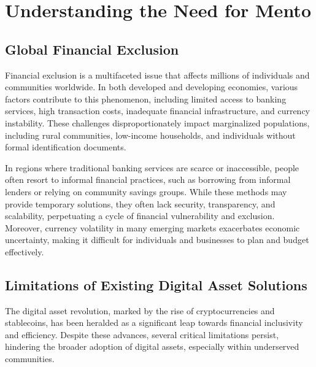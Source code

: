 \documentclass[a4paper]{article}
\theoremstyle{definition}
\begin{document}
\section{Understanding the Need for Mento}
\label{sec:need_for_mento}

\subsection{Global Financial Exclusion}

Financial exclusion is a multifaceted issue that affects millions of individuals and communities worldwide. In both developed and developing economies, various factors contribute to this phenomenon, including limited access to banking services, high transaction costs, inadequate financial infrastructure, and currency instability. These challenges disproportionately impact marginalized populations, including rural communities, low-income households, and individuals without formal identification documents.

In regions where traditional banking services are scarce or inaccessible, people often resort to informal financial practices, such as borrowing from informal lenders or relying on community savings groups. While these methods may provide temporary solutions, they often lack security, transparency, and scalability, perpetuating a cycle of financial vulnerability and exclusion. Moreover, currency volatility in many emerging markets exacerbates economic uncertainty, making it difficult for individuals and businesses to plan and budget effectively.

\subsection{Limitations of Existing Digital Asset Solutions}

The digital asset revolution, marked by the rise of cryptocurrencies and stablecoins, has been heralded as a significant leap towards financial inclusivity and efficiency. Despite these advances, several critical limitations persist, hindering the broader adoption of digital assets, especially within underserved communities.
\end{document}
